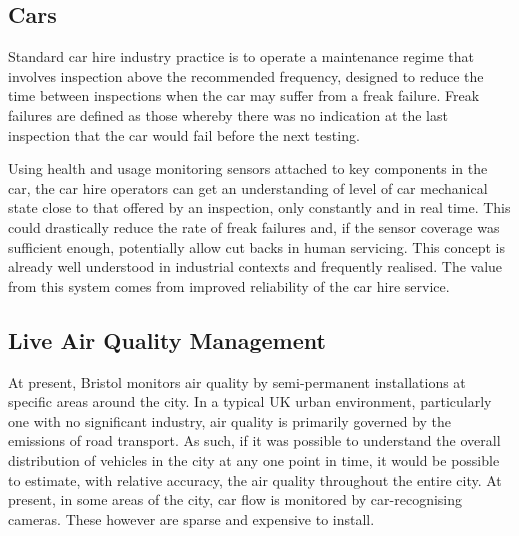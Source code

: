 \documentclass[conference]{IEEEtran}
\begin{document}
\subsection{Cars}

Standard car hire industry practice is to operate a maintenance regime
that involves inspection above the recommended frequency, designed to
reduce the time between inspections when the car may suffer from a
freak failure. Freak failures are defined as those whereby there was
no indication at the last inspection that the car would fail before
the next testing.

Using health and usage monitoring sensors attached to key components
in the car, the car hire operators can get an understanding of level
of car mechanical state close to that offered by an inspection, only
constantly and in real time. This could drastically reduce the rate of
freak failures and, if the sensor coverage was sufficient enough,
potentially allow cut backs in human servicing.  This concept is
already well understood in industrial contexts and frequently
realised. The value from this system comes from improved reliability
of the car hire service.




\subsection{Live Air Quality Management}

At present, Bristol monitors air quality by semi-permanent
installations at specific areas around the city.  In a typical UK
urban environment, particularly one with no significant industry, air
quality is primarily governed by the emissions of road transport.  As
such, if it was possible to understand the overall distribution of
vehicles in the city at any one point in time, it would be possible to
estimate, with relative accuracy, the air quality throughout the
entire city. At present, in some areas of the city, car flow is
monitored by car-recognising cameras. These however are sparse and
expensive to install.
\end{document}
